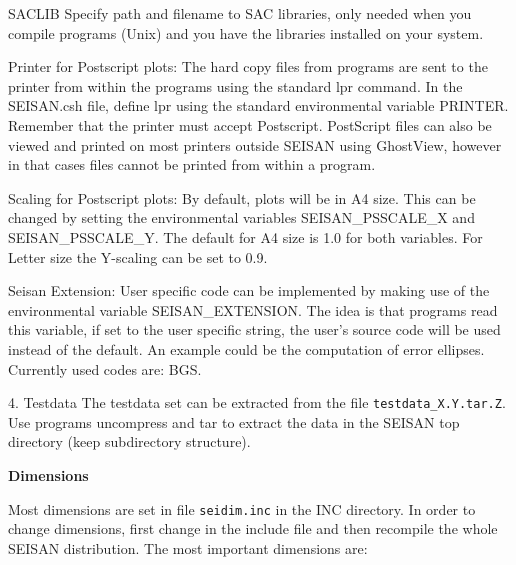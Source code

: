 SACLIB\newline
Specify path and filename to SAC libraries, only needed when you compile programs (Unix) and you have the libraries installed on your system. 

Printer for Postscript plots:\newline
The hard copy files from programs are sent to the printer from within the programs using the standard lpr command. In the SEISAN.csh file, define lpr using the standard environmental variable PRINTER. Remember that the printer must accept Postscript. PostScript files can also be viewed and printed on most printers outside SEISAN using GhostView, however in that cases files cannot be printed from within a program. 

Scaling for Postscript plots:\newline
By default, plots will be in A4 size. This can be changed by setting 
the environmental variables \newline
SEISAN\_PSSCALE\_X and SEISAN\_PSSCALE\_Y. The default for A4 size 
is 1.0 for both variables. For Letter size the Y-scaling can be set to 0.9. 

Seisan Extension: \newline
User specific code can be implemented by making use of the environmental 
variable SEISAN\_EXTENSION. The idea is that programs read this variable, 
if set to the user specific string, the user's source code will be 
used instead of the default. An example could be the computation of 
error ellipses. Currently used codes are: BGS. 

4. Testdata The testdata set can be extracted from the file 
\texttt{testdata\_X.Y.tar.Z}. Use programs uncompress and tar to 
extract the data in the SEISAN top directory (keep subdirectory structure). 

\textbf{Dimensions}

Most dimensions are set in file 
\texttt{seidim.inc} in the INC directory. 
In order to change dimensions, first change in the include 
file and then recompile the whole SEISAN distribution. The 
most important dimensions are: 


